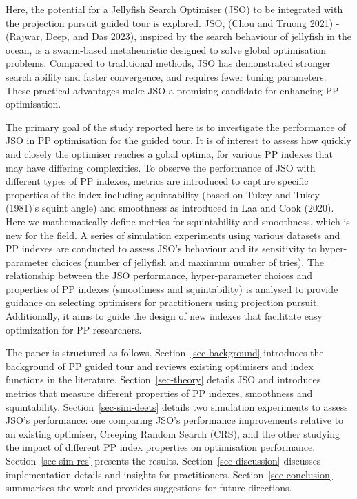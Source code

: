 \documentclass[
  12pt,
]{interact}
\theoremstyle{plain}
\begin{document}
Here, the potential for a Jellyfish Search Optimiser (JSO) to be
integrated with the projection pursuit guided tour is explored. JSO,
(Chou and Truong 2021) - (Rajwar, Deep, and Das 2023), inspired by the
search behaviour of jellyfish in the ocean, is a swarm-based
metaheuristic designed to solve global optimisation problems. Compared
to traditional methods, JSO has demonstrated stronger search ability and
faster convergence, and requires fewer tuning parameters. These
practical advantages make JSO a promising candidate for enhancing PP
optimisation.

The primary goal of the study reported here is to investigate the
performance of JSO in PP optimisation for the guided tour. It is of
interest to assess how quickly and closely the optimiser reaches a gobal
optima, for various PP indexes that may have differing complexities. To
observe the performance of JSO with different types of PP indexes,
metrics are introduced to capture specific properties of the index
including squintability (based on Tukey and Tukey (1981)'s squint angle)
and smoothness as introduced in Laa and Cook (2020). Here we
mathematically define metrics for squintability and smoothness, which is
new for the field. A series of simulation experiments using various
datasets and PP indexes are conducted to assess JSO's behaviour and its
sensitivity to hyper-parameter choices (number of jellyfish and maximum
number of tries). The relationship between the JSO performance,
hyper-parameter choices and properties of PP indexes (smoothness and
squintability) is analysed to provide guidance on selecting optimisers
for practitioners using projection pursuit. Additionally, it aims to
guide the design of new indexes that facilitate easy optimization for PP
researchers.

The paper is structured as follows. Section~\ref{sec-background}
introduces the background of PP guided tour and reviews existing
optimisers and index functions in the literature.
Section~\ref{sec-theory} details JSO and introduces metrics that measure
different properties of PP indexes, smoothness and squintability.
Section~\ref{sec-sim-deets} details two simulation experiments to assess
JSO's performance: one comparing JSO's performance improvements relative
to an existing optimiser, Creeping Random Search (CRS), and the other
studying the impact of different PP index properties on optimisation
performance. Section~\ref{sec-sim-res} presents the results.
Section~\ref{sec-discussion} discusses implementation details and
insights for practitioners. Section~\ref{sec-conclusion} summarises the
work and provides suggestions for future directions.
\end{document}
